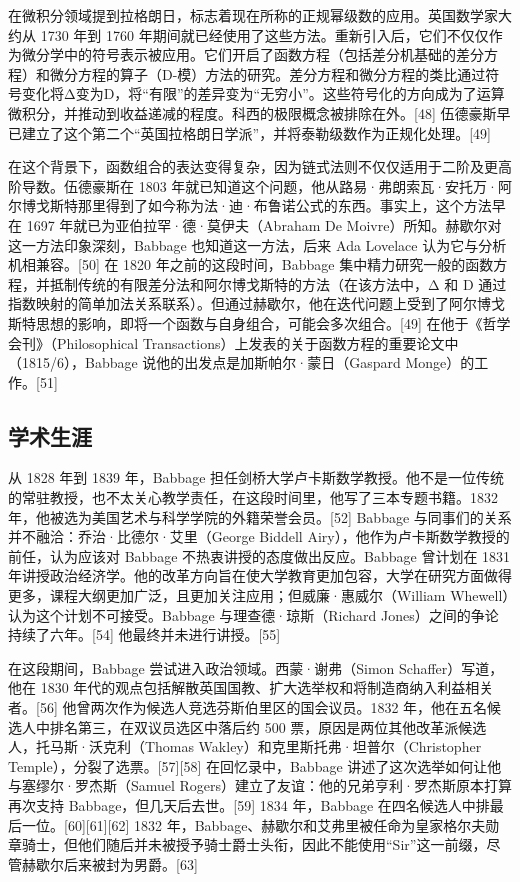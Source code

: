 在微积分领域提到拉格朗日，标志着现在所称的正规幂级数的应用。英国数学家大约从 1730 年到 1760 年期间就已经使用了这些方法。重新引入后，它们不仅仅作为微分学中的符号表示被应用。它们开启了函数方程（包括差分机基础的差分方程）和微分方程的算子（D-模）方法的研究。差分方程和微分方程的类比通过符号变化将Δ变为D，将“有限”的差异变为“无穷小”。这些符号化的方向成为了运算微积分，并推动到收益递减的程度。科西的极限概念被排除在外。[48] 伍德豪斯早已建立了这个第二个“英国拉格朗日学派”，并将泰勒级数作为正规化处理。[49]

在这个背景下，函数组合的表达变得复杂，因为链式法则不仅仅适用于二阶及更高阶导数。伍德豪斯在 1803 年就已知道这个问题，他从路易·弗朗索瓦·安托万·阿尔博戈斯特那里得到了如今称为法·迪·布鲁诺公式的东西。事实上，这个方法早在 1697 年就已为亚伯拉罕·德·莫伊夫（Abraham De Moivre）所知。赫歇尔对这一方法印象深刻，Babbage 也知道这一方法，后来 Ada Lovelace 认为它与分析机相兼容。[50] 在 1820 年之前的这段时间，Babbage 集中精力研究一般的函数方程，并抵制传统的有限差分法和阿尔博戈斯特的方法（在该方法中，Δ 和 D 通过指数映射的简单加法关系联系）。但通过赫歇尔，他在迭代问题上受到了阿尔博戈斯特思想的影响，即将一个函数与自身组合，可能会多次组合。[49] 在他于《哲学会刊》（Philosophical Transactions）上发表的关于函数方程的重要论文中（1815/6），Babbage 说他的出发点是加斯帕尔·蒙日（Gaspard Monge）的工作。[51]
\subsection{学术生涯} 
从 1828 年到 1839 年，Babbage 担任剑桥大学卢卡斯数学教授。他不是一位传统的常驻教授，也不太关心教学责任，在这段时间里，他写了三本专题书籍。1832 年，他被选为美国艺术与科学学院的外籍荣誉会员。[52] Babbage 与同事们的关系并不融洽：乔治·比德尔·艾里（George Biddell Airy），他作为卢卡斯数学教授的前任，认为应该对 Babbage 不热衷讲授的态度做出反应。Babbage 曾计划在 1831 年讲授政治经济学。他的改革方向旨在使大学教育更加包容，大学在研究方面做得更多，课程大纲更加广泛，且更加关注应用；但威廉·惠威尔（William Whewell）认为这个计划不可接受。Babbage 与理查德·琼斯（Richard Jones）之间的争论持续了六年。[54] 他最终并未进行讲授。[55]

在这段期间，Babbage 尝试进入政治领域。西蒙·谢弗（Simon Schaffer）写道，他在 1830 年代的观点包括解散英国国教、扩大选举权和将制造商纳入利益相关者。[56] 他曾两次作为候选人竞选芬斯伯里区的国会议员。1832 年，他在五名候选人中排名第三，在双议员选区中落后约 500 票，原因是两位其他改革派候选人，托马斯·沃克利（Thomas Wakley）和克里斯托弗·坦普尔（Christopher Temple），分裂了选票。[57][58] 在回忆录中，Babbage 讲述了这次选举如何让他与塞缪尔·罗杰斯（Samuel Rogers）建立了友谊：他的兄弟亨利·罗杰斯原本打算再次支持 Babbage，但几天后去世。[59] 1834 年，Babbage 在四名候选人中排最后一位。[60][61][62] 1832 年，Babbage、赫歇尔和艾弗里被任命为皇家格尔夫勋章骑士，但他们随后并未被授予骑士爵士头衔，因此不能使用“Sir”这一前缀，尽管赫歇尔后来被封为男爵。[63]
